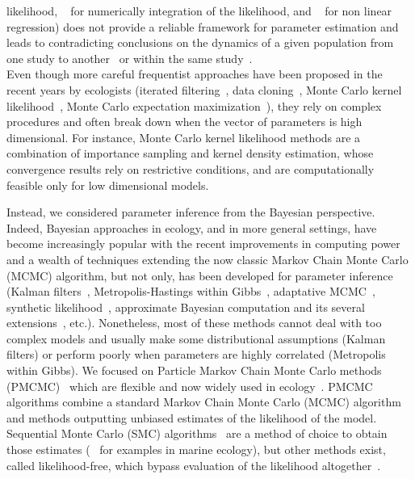 \documentclass[12pt]{article}
\begin{document}
	likelihood, ~\cite{de2002fitting} for numerically integration of the likelihood, and ~\cite{yang2008importance} for non linear regression) does not provide a reliable framework for parameter estimation and leads to contradicting conclusions on the dynamics of a given population from one study to another~\cite{sibly2005regulation, saether2002pattern} or within the same study~\cite{de2002fitting}. \\
	Even though more careful frequentist approaches have been proposed in the recent years by ecologists (iterated filtering~\cite{ionides2006inference}, data cloning~\cite{lele2007data}, Monte Carlo kernel likelihood~\cite{valpine2005state}, Monte Carlo
	expectation maximization~\cite{booth1999maximizing}), they rely on complex procedures and often break down when the vector of parameters is high dimensional. For instance, Monte Carlo kernel likelihood methods are a combination of importance sampling and kernel density estimation, whose convergence results rely on restrictive conditions, and are computationally feasible only for low dimensional models.
	
	Instead, we considered parameter inference from the Bayesian perspective. 
	Indeed, Bayesian approaches in ecology, and in more general settings, have become increasingly popular with the recent improvements in computing power and a wealth of techniques extending the now classic Markov Chain Monte Carlo (MCMC) algorithm, but not only, has been developed for parameter inference (Kalman filters~\cite{sorenson1960kalman}, Metropolis-Hastings within Gibbs~\cite{geweke2001Bayesian}, adaptative MCMC~\cite{Andrieu2008}, synthetic likelihood~\cite{wood2010statistical}, approximate Bayesian computation and its several extensions~\cite{marin2012approximate}, etc.). Nonetheless, most of these methods cannot deal with too complex models and usually make some distributional assumptions (Kalman filters) or perform poorly when parameters are highly correlated (Metropolis within Gibbs). We focused on Particle Markov Chain Monte Carlo methods (PMCMC)~\cite{andrieu2010particle} which are flexible and now widely used in ecology~\cite{peters2010ecological, gao2012bayesian, fasiolo2014statistical}. PMCMC algorithms combine a standard Markov Chain Monte Carlo (MCMC) algorithm and methods outputting unbiased estimates of the likelihood of the model. Sequential Monte Carlo (SMC) algorithms~\cite{del2004feynman} are a method of choice to obtain those estimates (~\cite{losa2003sequential, dowd2006sequential, jones2010bayesian} for examples in marine ecology), but other methods exist, called likelihood-free, which bypass evaluation of the likelihood altogether~\cite{toni2009approximate}.
	
\end{document}

